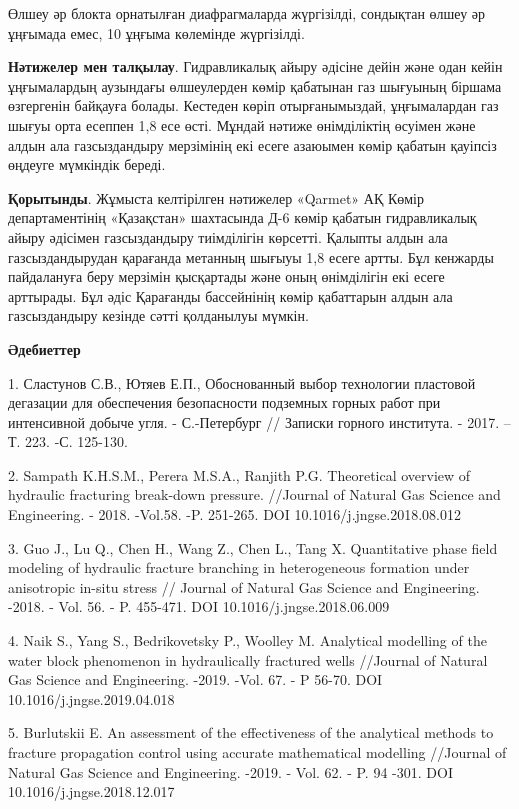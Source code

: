 Өлшеу әр блокта орнатылған диафрагмаларда жүргізілді, сондықтан өлшеу әр
ұңғымада емес, 10 ұңғыма көлемінде жүргізілді.

{\bfseries Нәтижелер мен талқылау}. Гидравликалық айыру әдісіне дейін және
одан кейін ұңғымалардың аузындағы өлшеулерден көмір қабатынан газ
шығуының біршама өзгергенін байқауға болады. Кестеден көріп
отырғанымыздай, ұңғымалардан газ шығуы орта есеппен 1,8 есе өсті. Мұндай
нәтиже өнімділіктің өсуімен және алдын ала газсыздандыру мерзімінің екі
есеге азаюымен көмір қабатын қауіпсіз өңдеуге мүмкіндік береді.

{\bfseries Қорытынды}. Жұмыста келтірілген нәтижелер «Qarmet» АҚ Көмір
департаментінің «Қазақстан» шахтасында Д-6 көмір қабатын гидравликалық
айыру әдісімен газсыздандыру тиімділігін көрсетті. Қалыпты алдын ала
газсыздандырудан қарағанда метанның шығыуы 1,8 есеге артты. Бұл кенжарды
пайдалануға беру мерзімін қысқартады және оның өнімділігін екі есеге
арттырады. Бұл әдіс Қарағанды бассейнінің көмір қабаттарын алдын ала
газсыздандыру кезінде сәтті қолданылуы мүмкін.

{\bfseries Әдебиеттер}

1. Сластунов С.В., Ютяев Е.П., Обоснованный выбор технологии пластовой
дегазации для обеспечения безопасности подземных горных работ при
интенсивной добыче угля. - С.-Петербург // Записки горного института. -
2017. --Т. 223. -С. 125-130.

2. Sampath K.H.S.M., Perera M.S.A., Ranjith P.G. Theoretical overview of
hydraulic fracturing break-down pressure. //Journal of Natural Gas
Science and Engineering. - 2018. -Vol.58. -P. 251-265. DOI
10.1016/j.jngse.2018.08.012

3. Guo J., Lu Q., Chen H., Wang Z., Chen L., Tang X. Quantitative phase
field modeling of hydraulic fracture branching in heterogeneous
formation under anisotropic in-situ stress // Journal of Natural Gas
Science and Engineering. -2018. - Vol. 56. - P. 455-471. DOI
10.1016/j.jngse.2018.06.009

4. Naik S., Yang S., Bedrikovetsky P., Woolley M. Analytical modelling
of the water block phenomenon in hydraulically fractured wells //Journal
of Natural Gas Science and Engineering. -2019. -Vol. 67. - P 56-70. DOI
10.1016/j.jngse.2019.04.018

5. Burlutskii E. An assessment of the effectiveness of the analytical
methods to fracture propagation control using accurate mathematical
modelling //Journal of Natural Gas Science and Engineering. -2019. -
Vol. 62. - P. 94 -301. DOI 10.1016/j.jngse.2018.12.017

